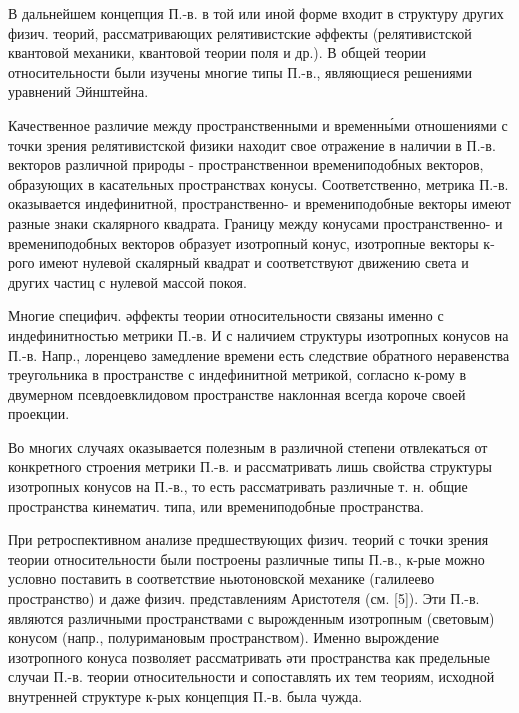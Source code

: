 \documentclass[10pt]{article}
\begin{document}
В дальнейшем концепция П.-в. в той или иной форме входит в структуру других физич. теорий, рассматривающих релятивистские әффекты (релятивистской квантовой механики, квантовой теории поля и др.). В общей теории относительности были изучены многие типы П.-в., являющиеся решениями уравнений Эйнштейна.



Качественное различие между пространственными и временны́ми отношениями с точки зрения релятивистской физики находит свое отражение в наличии в П.-в. векторов различной природы - пространственнои времениподобных векторов, образующих в касательных пространствах конусы. Соответственно, метрика П.-в. оказывается индефинитной, пространственно- и времениподобные векторы имеют разные знаки скалярного квадрата. Границу между конусами пространственно- и времениподобных векторов образует изотропный конус, изотропные векторы к-рого имеют нулевой скалярный квадрат и соответствуют движению света и других частиц с нулевой массой покоя.



Многие специфич. әффекты теории относительности связаны именно с индефинитностью метрики П.-в. И с наличием структуры изотропных конусов на П.-в. Напр., лоренцево замедление времени есть следствие обратного неравенства треугольника в пространстве с индефинитной метрикой, согласно к-рому в двумерном псевдоевклидовом пространстве наклонная всегда короче своей проекции.



Во многих случаях оказывается полезным в различной степени отвлекаться от конкретного строения метрики П.-в. и рассматривать лишь свойства структуры изотропных конусов на П.-в., то есть рассматривать различные т. н. общие пространства кинематич. типа, или времениподобные пространства.



При ретроспективном анализе предшествующих физич. теорий с точки зрения теории относительности были построены различные типы П.-в., к-рые можно условно поставить в соответствие ньютоновской механике (галилеево пространство) и даже физич. представлениям Аристотеля (см. [5]). Эти П.-в. являются различными пространствами с вырожденным изотропным (световым) конусом (напр., полуримановым пространством). Именно вырождение изотропного конуса позволяет рассматривать әти пространства как предельные случаи П.-в. теории относительности и сопоставлять их тем теориям, исходной внутренней структуре к-рых концепция П.-в. была чужда.
\end{document}
